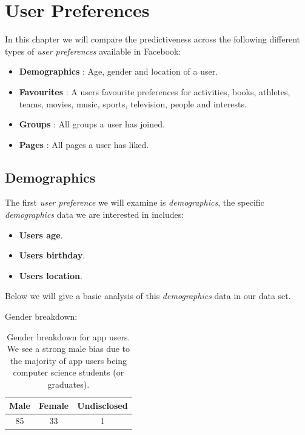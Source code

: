 
\chapter{User Preferences}
\label{cha:ivg}

In this chapter we will compare the predictiveness across the following different types of \emph{user preferences} available
in Facebook:
\begin{itemize}
\item \textbf{Demographics} : Age, gender and location of a user.
\item \textbf{Favourites} : A users favourite preferences for activities, books, athletes, teams, movies, music, sports, television, people and interests.
\item \textbf{Groups} : All groups a user has joined.
\item \textbf{Pages} :  All pages a user has liked.
\end{itemize}

\section{Demographics}
\label{sec:demo}

The first \emph{user preference} we will examine is \emph{demographics}, the specific \emph{demographics} data we are interested in includes:
\begin{itemize}
\item \textbf{Users age}.
\item \textbf{Users birthday}.
\item \textbf{Users location}.
\end{itemize}

Below we will give a basic analysis of this \emph{demographics} data in our data set.

Gender breakdown:

\begin{table}[!htbp]
\centering
	\begin{tabular}{|c|c|c|} %
		\hline
		\textbf{Male} & \textbf{Female} & \textbf{Undisclosed}  \\ \hline
		85 & 33 & 1 \\ \hline
	\end{tabular}
	\caption{Gender breakdown for app users. We see a strong male bias due to the majority of app users being computer science students (or graduates).}
	\label{tab:revpol}
\end{table}

